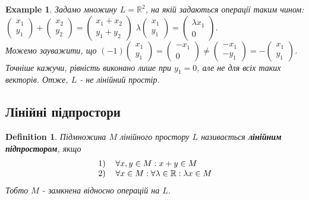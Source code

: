 \documentclass[a4paper, 10pt]{article}
\theoremstyle{theoremdd}
\newtheorem{definition}[theorem]{Definition}
\newtheorem{example}[theorem]{Example}
\begin{document}
	\begin{example}
	Задамо множину $L = \mathbb{R}^2$, на якій задаються операції таким чином:\\
	$\begin{pmatrix}
	x_1 \\ y_1
	\end{pmatrix} + \begin{pmatrix}
	x_2 \\ y_2
	\end{pmatrix} = \begin{pmatrix}
	x_1 + x_2 \\ y_1+y_2
	\end{pmatrix}$ \hspace{1cm} $\lambda \begin{pmatrix}
	x_1 \\ y_1
	\end{pmatrix} = \begin{pmatrix}
	\lambda x_1 \\ 0
	\end{pmatrix}$.\\
	Можемо зауважити, що $(-1) \begin{pmatrix}
	x_1 \\ y_1
	\end{pmatrix} = \begin{pmatrix}
	-x_1 \\ 0
	\end{pmatrix} \neq \begin{pmatrix}
	-x_1 \\ -y_1
	\end{pmatrix} = - \begin{pmatrix}
	x_1 \\ y_1
	\end{pmatrix}$. Точніше кажучи, рівність виконано лише при $y_1 = 0$, але не для всіх таких векторів. Отже, $L$ - не лінійний простір.
	\end{example}
	
	\subsection{Лінійні підпростори}
	\begin{definition}
	Підмножина $M$ лінійного простору $L$ називається \textbf{лінійним підпростором}, якщо
	\begin{align*}
	\begin{tabular}{cl}
	1) & $\forall x, y \in M: x + y \in M$\\
	2) & $\forall x \in M: \forall \lambda \in \mathbb{R}: \lambda x \in M$\\
	\end{tabular}
	\end{align*}
	Тобто $M$ - замкнена відносно операцій на $L$.
	\end{definition}
	
\end{document}
